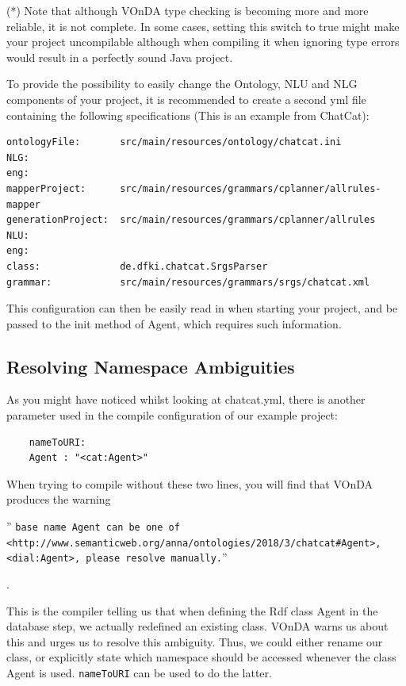 \documentclass[a4paper]{report}
\newcommand{\vonda}{VOnDA\xspace}
\begin{document}
(*) Note that although \vonda type checking is becoming more and more reliable,
it is not complete. In some cases, setting this switch to true might make your
project uncompilable although when compiling it when ignoring type errors would
result in a perfectly sound Java project.

To provide the possibility to easily change the Ontology, NLU and NLG
components of your project, it is recommended to create a second yml file
containing the following specifications (This is an example from ChatCat):

\begin{verbatim}
ontologyFile:       src/main/resources/ontology/chatcat.ini
NLG:
eng:
mapperProject:      src/main/resources/grammars/cplanner/allrules-mapper
generationProject:  src/main/resources/grammars/cplanner/allrules
NLU:
eng:
class:              de.dfki.chatcat.SrgsParser
grammar:            src/main/resources/grammars/srgs/chatcat.xml
\end{verbatim}

This configuration can then be easily read in when starting your project, and
be passed to the init method of Agent, which requires such information.

\subsection{Resolving Namespace Ambiguities}

As you might have noticed whilst looking at chatcat.yml, there is another
parameter used in the compile configuration of our example project:

\begin{verbatim}
	nameToURI:
	Agent : "<cat:Agent>"
\end{verbatim}

When trying to compile without these two lines, you will find that \vonda
produces the warning \begin{small}'' \texttt{base name Agent can be one of
    <http://www.semanticweb.org/anna/ontologies/2018/3/chatcat\#Agent>,
    <dial:Agent>, please resolve manually.}''
\end{small}.

This is the compiler telling us that when defining the Rdf class Agent in the
database step, we actually redefined an existing class. \vonda warns us about
this and urges us to resolve this ambiguity. Thus, we could either rename our
class, or explicitly state which namespace should be accessed whenever the
class Agent is used. \texttt{nameToURI} can be used to do the latter.
\end{document}
